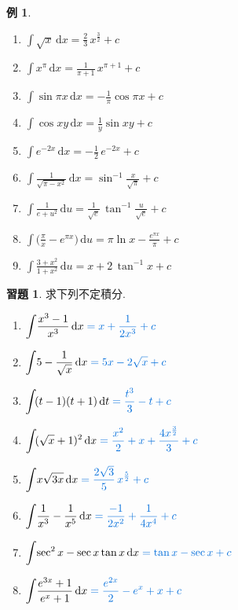 \documentclass[12pt]{extarticle}
\newcommand{\ds}{\displaystyle}
\theoremstyle{definition}
\newtheorem*{ex}{例}
\newtheorem*{exe}{習題}
\begin{document}
\begin{ex}
  \setlength{\columnsep}{-7mm}
  \begin{multicols}{3}
    \begin{enumerate}\setlength{\itemsep}{0pt}
      \item $\ds\int\!\sqrt{x}\,\text{d}x = \frac{2}{3}\,x^{\frac{3}{2}} + c$
      \item $\ds\int x^\pi\,\text{d}x = \frac{1}{\pi + 1}\,x^{\pi + 1} + c$
      \item $\ds\int\!\sin\pi x\,\text{d}x = -\frac{1}{\pi}\cos\pi x + c$
      \item $\ds\int\!\cos xy\,\text{d}x = \frac{1}{y}\sin xy + c$
      \item $\ds\int e^{-2x}\,\text{d}x = -\frac{1}{2}\,e^{-2 x} + c$
      \item $\ds\int\!\frac{1}{\sqrt{\pi - x^2}}\,\text{d}x = \sin^{-1}\frac{x}{\sqrt{\pi}} + c$
      \item $\ds\int\!\frac{1}{e + u^2}\,\text{d}u = \frac{1}{\sqrt{e}}\,\tan^{-1}\frac{u}{\sqrt{e}} + c$
      \item $\ds\int\!\Big(\frac{\pi}{x} - e^{\pi x}\Big)\,\text{d}u = \pi\ln x - \frac{e^{\pi x}}{\pi} + c$
      \item $\ds\int\!\frac{3 + x^2}{1 + x^2}\,\text{d}u = x + 2\,\tan^{-1}x + c$
    \end{enumerate} 
  \end{multicols}
\end{ex}

\begin{exe} 求下列不定積分. 
  \setlength{\columnsep}{-2cm}
  \begin{multicols}{2}
    \begin{enumerate}\setlength{\itemsep}{0pt}
      \item $\ds\int\!\frac{x^3 - 1}{x^3}\,\text{d}x {\color{C2}\;= x + \frac{1}{2x^3} + c}$
      \item $\ds\int\!5 - \frac{1}{\sqrt{x}}\,\text{d}x {\color{C2}\;= 5x - 2\sqrt{x} + c}$
      \item $\ds\int\!(t - 1)(t + 1)\,\text{d}t {\color{C2}\;= \frac{t^3}{3} - t + c}$
      \item $\ds\int\!(\sqrt{x} + 1)^2\,\text{d}x {\color{C2}\;= \frac{x^2}{2} + x + \frac{4 x^{\frac{3}{2}}}{3} + c}$
      \item $\ds\int\!x\sqrt{3x}\,\text{d}x {\color{C2}\;= \frac{2\sqrt{3}}{5}\,x^{\frac{5}{2}} + c}$
      \item $\ds\int\!\frac{1}{x^3} - \frac{1}{x^5}\,\text{d}x {\color{C2}\;= \frac{-1}{2x^2} + \frac{1}{4x^4} + c}$
      \item $\ds\int\!\sec^2 x - \sec x\tan x\,\text{d}x {\color{C2}\;= \tan x - \sec x + c}$
      \item $\ds\int\!\frac{e^{3x} + 1}{e^x + 1}\,\text{d}x {\color{C2}\;= \frac{e^{2x}}{2} - e^x + x + c}$
    \end{enumerate} 
  \end{multicols}
\end{exe}
\end{document}

